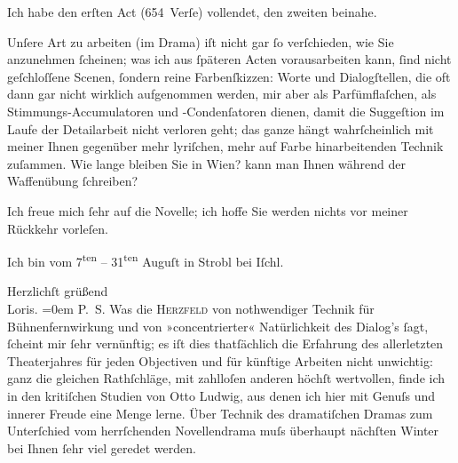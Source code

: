 \pstart
           Ich habe den erſten Act
               (654 Verſe) vollendet, den zweiten beinahe.\pend
           
\pstart
           Unſere Art zu arbeiten (im Drama) iſt nicht gar ſo verſchieden, wie Sie anzunehmen
               ſcheinen; was ich {\pb}aus ſpäteren
               Acten vorausarbeiten kann, ſind nicht geſchloſſene Scenen, ſondern reine
               Farbenſkizzen: Worte und Dialogſtellen, die oft dann gar nicht wirklich aufgenommen
               werden, mir aber als Parfümflaſchen, als Stimmungs-Accumulatoren und -Condenſatoren
               dienen, damit die Suggeſtion im Laufe der Detailarbeit nicht verloren geht; das ganze
               hängt wahrſcheinlich mit meiner Ihnen gegenüber mehr lyriſchen, mehr auf Farbe
               hinarbeitenden Technik zuſammen. Wie lange {\pb}bleiben Sie in Wien? kann man Ihnen während der Waffenübung ſchreiben?\pend
           
\pstart
           Ich freue mich ſehr auf die Novelle; ich hoffe
               Sie werden nichts vor meiner Rückkehr vorleſen.\pend
           
\pstart
           Ich bin vom 7\textsuperscript{ten} – 31\textsuperscript{ten} Auguſt in Strobl bei Iſchl.\pend
           
\pstart
           Herzlichſt grüßend{\\[\baselineskip]}\spacefill\mbox{Loris.}\pend
           \leftskip=0em{}
\pstart
           \noindent{}\textsc{P. S.} Was die \textsc{Herzfeld} von nothwendiger Technik  für
                  Bühnenfernwirkung und von »concentrierter« Natürlichkeit des Dialog’s ſagt,
                  ſcheint mir ſehr vernünftig; {\pb}es iſt dies thatſächlich die Erfahrung des allerletzten Theaterjahres für jeden
                  Objectiven und für künftige Arbeiten nicht unwichtig: ganz die gleichen
                  Rathſchläge, mit zahlloſen anderen höchſt wertvollen, finde ich in den kritiſchen
                  Studien von Otto Ludwig, aus denen ich hier
                  mit Genuſs und innerer Freude eine Menge lerne. Über Technik des dramatiſchen
                  Dramas zum Unterſchied vom herrſchenden Novellendrama muſs überhaupt nächſten
                  Winter bei Ihnen ſehr viel geredet werden.\pend
           \endnumbering{}  
      